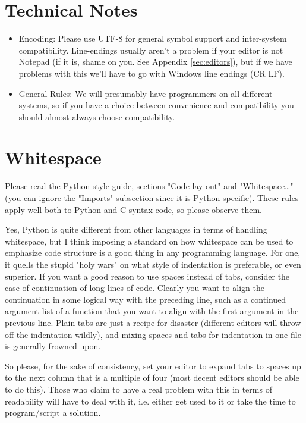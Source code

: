 \documentclass[12pt]{article}
\begin{document}
\section{Technical Notes}
\begin{itemize}
    \item Encoding: Please use UTF-8 for general symbol support and inter-system compatibility. Line-endings usually aren't a problem if your editor is not Notepad (if it is, shame on you. See Appendix \ref{sec:editors}), but if we have problems with this we'll have to go with Windows line endings (CR LF).
    \item General Rules: We will presumably have programmers on all different systems, so if you have a choice between convenience and compatibility you should almost always choose compatibility.

\end{itemize}

\section{Whitespace}
Please read the \hyperref[pyguide]{Python style guide}, sections "Code lay-out" and "Whitespace\ldots" (you can ignore the "Imports" subsection since it is Python-specific). These rules apply well both to Python and C-syntax code, so please observe them.

Yes, Python is quite different from other languages in terms of handling whitespace, but I think imposing a standard on how whitespace can be used to emphasize code structure is a good thing in any programming language. For one, it quells the stupid "holy wars" on what style of indentation is preferable, or even superior. If you want a good reason to use spaces instead of tabs, consider the case of continuation of long lines of code. Clearly you want to align the continuation in some logical way with the preceding line, such as a continued argument list of a function that you want to align with the first argument in the previous line. Plain tabs are just a recipe for disaster (different editors will throw off the indentation wildly), and mixing spaces and tabs for indentation in one file is generally frowned upon.

So please, for the sake of consistency, set your editor to expand tabs to spaces up to the next column that is a multiple of four (most decent editors should be able to do this). Those who claim to have a real problem with this in terms of readability will have to deal with it, i.e. either get used to it or take the time to program/script a solution.
\end{document}
